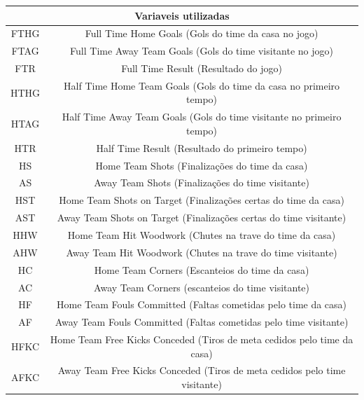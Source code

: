 \begin{table}[]
	\begin{tabular}{@{}|c|c|@{}}
		\toprule
		\multicolumn{2}{|c|}{\textbf{Variaveis utilizadas}}                              \\ \midrule
		FTHG & Full Time Home Goals (Gols do time da casa no jogo)                       \\ \midrule
		FTAG & Full Time Away Team Goals (Gols do time visitante no jogo)                \\ \midrule
		FTR  & Full Time Result (Resultado do jogo)                                      \\ \midrule
		HTHG & Half Time Home Team Goals (Gols do time da casa no primeiro tempo)        \\ \midrule
		HTAG & Half Time Away Team Goals (Gols do time visitante no primeiro tempo)      \\ \midrule
		HTR  & Half Time Result (Resultado do primeiro tempo)                            \\ \midrule
		HS   & Home Team Shots (Finalizações do time da casa)                            \\ \midrule
		AS   & Away Team Shots (Finalizações do time visitante)                          \\ \midrule
		HST  & Home Team Shots on Target (Finalizações certas do time da casa)           \\ \midrule
		AST  & Away Team Shots on Target (Finalizações certas do time visitante)         \\ \midrule
		HHW  & Home Team Hit Woodwork (Chutes na trave do time da casa)                  \\ \midrule
		AHW  & Away Team Hit Woodwork (Chutes na trave do time visitante)                \\ \midrule
		HC   & Home Team Corners (Escanteios do time da casa)                            \\ \midrule
		AC   & Away Team Corners (escanteios do time visitante)                          \\ \midrule
		HF   & Home Team Fouls Committed (Faltas cometidas pelo time da casa)            \\ \midrule
		AF   & Away Team Fouls Committed (Faltas cometidas pelo time visitante)          \\ \midrule
		HFKC & Home Team Free Kicks Conceded (Tiros de meta cedidos pelo time da casa)   \\ \midrule
		AFKC & Away Team Free Kicks Conceded (Tiros de meta cedidos pelo time visitante) \\ \midrule

\end{tabular}
\end{table}
